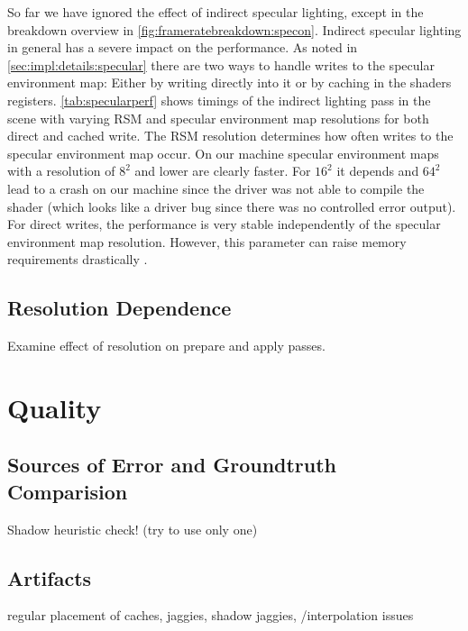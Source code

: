 \documentclass[thesis.tex]{subfiles}
\begin{document}
So far we have ignored the effect of indirect specular lighting, except in the breakdown overview in \autoref{fig:frameratebreakdown:specon}.
Indirect specular lighting in general has a severe impact on the performance.
As noted in \autoref{sec:impl:details:specular} there are two ways to handle writes to the specular environment map:
Either by writing directly into it or by caching in the shaders registers.
\autoref{tab:specularperf} shows timings of the indirect lighting pass in the  scene with varying RSM and specular environment map resolutions for both direct and cached write.
The RSM resolution determines how often writes to the specular environment map occur.
On our machine specular environment maps with a resolution of $8^2$ and lower are clearly faster.
For $16^2$ it depends and $64^2$ lead to a crash on our machine since the driver was not able to compile the shader (which looks like a driver bug since there was no controlled error output).
\\
For direct writes, the performance is very stable independently of the specular environment map resolution.
However, this parameter can raise memory requirements drastically .

\subsection{Resolution Dependence}
Examine effect of resolution on prepare and apply passes.

\newpage

\section{Quality}

\subsection{Sources of Error and Groundtruth Comparision}
Shadow heuristic check! (try to use only one)

\subsection{Artifacts}
regular placement of caches, jaggies,
shadow jaggies,
/interpolation issues
\end{document}

